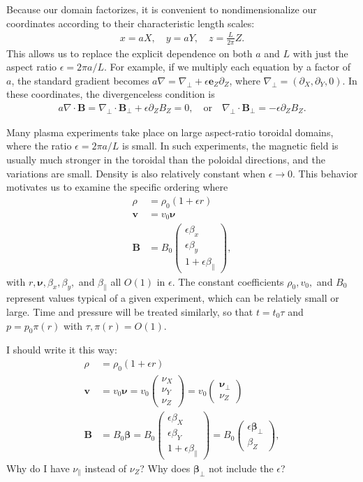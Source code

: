 \documentclass{article}
\newcommand{\para}{\parallel}
\newcommand{\ep}{\epsilon}
\newcommand{\np}{\nabla_\perp}
\newcommand{\p}{\partial}
\newcommand{\pth} [1] {\left( #1 \right) }
\newcommand{\pmat} [1] {\begin{pmatrix} #1 \end{pmatrix}}
\begin{document}
Because our domain factorizes, it is convenient to nondimensionalize our coordinates according to their characteristic length scales: 
\begin{align*}
    x=aX,\quad y=aY,\quad z=\frac{L}{2\pi}Z.
\end{align*}
This allows us to replace the explicit dependence on both $a$ and $L$ with just the aspect ratio $\ep = 2\pi a/L$. For example, if we multiply each equation by a factor of $a$, the standard gradient becomes $a\nabla = \np + \ep\bm{e}_Z\p_Z$, where $\np = \pth{\p_X, \p_Y, 0}$. In these coordinates, the divergenceless condition is    
\begin{align*}
    a\nabla\cdot\bm{B} = \np\cdot\bm{B}_\perp + \ep\p_Z B_Z = 0, \quad\text{or}\quad \np\cdot\bm{B}_\perp = -\ep\p_ZB_Z. 
\end{align*}

Many plasma experiments take place on large aspect-ratio toroidal domains, where the ratio $\ep = 2\pi a/L$ is small. In such experiments, the magnetic field is usually much stronger in the toroidal than the poloidal directions, and the variations are small. Density is also relatively constant when $\ep\to 0$. This behavior motivates us to examine the specific ordering where 
\begin{align*}
    \rho &= \rho_0 \pth{1+\ep r} \\
    \bm{v} &= v_0 \bm{\nu} \\ 
    \bm{B} &= B_0 \pmat{\ep\beta_x \\ \ep\beta_y \\ 1+\ep\beta_\para},
\end{align*}
with $r, \bm{\nu}, \beta_x, \beta_y,$ and $\beta_\para$ all $O\pth{1}$ in $\ep$. The constant coefficients $\rho_0, v_0,$ and $B_0$ represent values typical of a given experiment, which can be relatiely small or large. Time and pressure will be treated similarly, so that $t=t_0\tau$ and $p=p_0\pi(r)$ with $\tau,\pi(r) = O(1)$.

{\color{red} I should write it this way: 
\begin{align*}
    \rho &= \rho_0 \pth{1+\ep r} \\
    \bm{v} &= v_0 \bm{\nu} = v_0 \pmat{\nu_X \\ \nu_Y \\ \nu_Z} = v_0 \pmat{\bm{\nu}_\perp \\ \nu_Z} \\ 
    \bm{B} &= B_0 \bm{\beta} = B_0 \pmat{\ep\beta_X \\ \ep\beta_Y \\ 1+\ep\beta_\para} = B_0 \pmat{\ep\bm{\beta}_\perp \\ \beta_Z},
\end{align*}
Why do I have $\nu_\para$ instead of $\nu_Z$? Why does $\bm{\beta}_\perp$ not include the $\ep$?}
\end{document}

